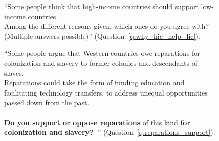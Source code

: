 \begin{figure}[h!]
    \caption[Agreement with rationales for global redistribution]{``Some people think that high-income countries should support low-income countries.~\\Among the different reasons given, which ones do you agree with? (Multiple answers possible)'' (Question~\ref{q:why_hic_help_lic}).
    }\label{fig:why_hic_help_lic}
\end{figure}

\begin{figure}[h!]
    \caption[Support for reparations for colonization and slavery]{``Some people argue that Western countries owe reparations for colonization and slavery to former colonies and descendants of slaves. \\Reparations could take the form of funding education and facilitating technology transfers, to address unequal opportunities passed down from the past. \\\\\textbf{Do you support or oppose reparations} of this kind \textbf{for colonization and slavery?~}'' (Question~\ref{q:reparations_support}).
    }\label{fig:reparations_support}
\end{figure}

